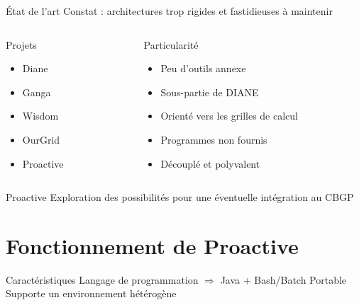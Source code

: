 \documentclass{beamer}
\begin{document}
\begin{frame}{État de l'art}
    Constat : architectures trop rigides et fastidieuses à maintenir
	\begin{columns}
	\begin{column}[l]{0.3\linewidth}
    \begin{block}{Projets}
        \begin{itemize}
            \item<2-> Diane
            \item<3-> Ganga
            \item<4-> Wisdom
            \item<5-> OurGrid
            \item<6-> Proactive
        \end{itemize}
    \end{block}
	\end{column}
	\begin{column}[r]{0.6\linewidth}
    \begin{exampleblock}{Particularité}
        \begin{itemize}
            \item<2-> Peu d'outils annexe
            \item<3-> Sous-partie de DIANE
            \item<4-> Orienté vers les grilles de calcul
            \item<5-> Programmes non fournis
            \item<6-> Découplé et polyvalent
        \end{itemize}
    \end{exampleblock}
	\end{column}
	\end{columns}
\end{frame}

\begin{frame}{Proactive}
    Exploration des possibilités pour une éventuelle intégration au CBGP
\end{frame}

\section[Fonctionnement]{Fonctionnement de Proactive}
\begin{frame}{Caractéristiques}
    Langage de programmation $\Longrightarrow$ Java + Bash/Batch
    Portable
    Supporte un environnement hétérogène%

\end{frame}
\end{document}
